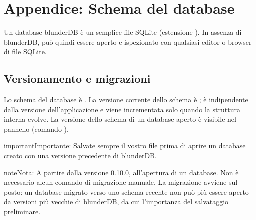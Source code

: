 \documentclass[letterpaper,10pt,italian]{sphinxmanual}
\begin{document}
\sphinxstepscope


\section{Appendice: Schema del database}
\label{\detokenize{annexe_db_scheme:annexe-schema-de-la-base-de-donnees}}\label{\detokenize{annexe_db_scheme:annexe-db-migration}}\label{\detokenize{annexe_db_scheme::doc}}
\sphinxAtStartPar
Un database blunderDB è un semplice file SQLite (estensione ). In assenza di blunderDB, può quindi essere aperto e ispezionato con qualsiasi editor o browser di file SQLite.


\subsection{Versionamento e migrazioni}
\label{\detokenize{annexe_db_scheme:versionnage-et-migrations}}
\sphinxAtStartPar
Lo schema del database è . La versione corrente dello schema è ; è indipendente dalla versione dell’applicazione e viene incrementata solo quando la struttura interna evolve. La versione dello schema di un database aperto è visibile nel pannello  (comando ).

\begin{sphinxadmonition}{important}{Importante:}
\sphinxAtStartPar
Salvate sempre il vostro file  prima di aprire un database creato con una versione precedente di blunderDB.
\end{sphinxadmonition}

\begin{sphinxadmonition}{note}{Nota:}
\sphinxAtStartPar
A partire dalla versione 0.10.0,  all’apertura di un database. Non è necessario alcun comando di migrazione manuale. La migrazione avviene sul posto: un database migrato verso uno schema recente non può più essere aperto da versioni più vecchie di blunderDB, da cui l’importanza del salvataggio preliminare.
\end{sphinxadmonition}
\end{document}
